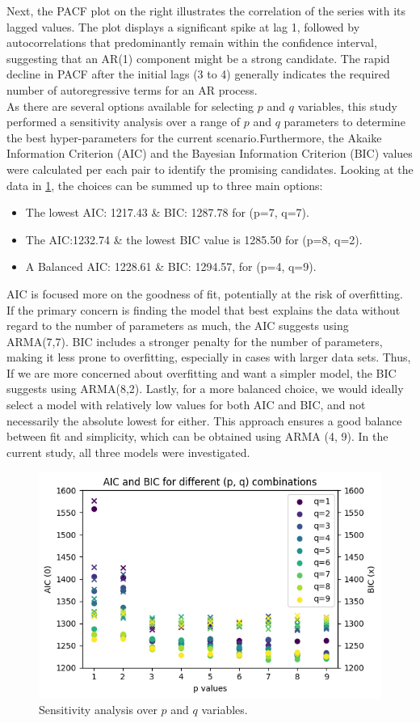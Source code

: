 \documentclass{article}
\begin{document}
Next, the PACF plot on the right illustrates the correlation of the series with its lagged values. The plot displays a significant spike at lag 1, followed by autocorrelations that predominantly remain within the confidence interval, suggesting that an AR(1) component might be a strong candidate. The rapid decline in PACF after the initial lags (3 to 4) generally indicates the required number of autoregressive terms for an AR process.\\ 
As there are several options available for selecting $p$ and $q$ variables, this study performed a sensitivity analysis over a range of $p$ and $q$ parameters to determine the best hyper-parameters for the current scenario.\@ Furthermore, the Akaike Information Criterion (AIC) and the Bayesian Information Criterion (BIC) values were calculated per each pair to identify the promising candidates. Looking at the data in \ref{fig:sensitivity}, the choices can be summed up to three main options:
\begin{itemize}
    \item The lowest AIC: 1217.43 \& BIC: 1287.78 for (p=7, q=7).
    \item The AIC:1232.74 \& the lowest BIC value is 1285.50 for (p=8, q=2).
    \item A Balanced AIC: 1228.61 \& BIC: 1294.57, for (p=4, q=9).
\end{itemize}
AIC is focused more on the goodness of fit, potentially at the risk of overfitting. If the primary concern is finding the model that best explains the data without regard to the number of parameters as much, the AIC suggests using ARMA(7,7).
BIC includes a stronger penalty for the number of parameters, making it less prone to overfitting, especially in cases with larger data sets. Thus, If we are more concerned about overfitting and want a simpler model, the BIC suggests using ARMA(8,2).
Lastly, for a more balanced choice, we would ideally select a model with relatively low values for both AIC and BIC, and not necessarily the absolute lowest for either. This approach ensures a good balance between fit and simplicity, which can be obtained using ARMA (4, 9). In the current study, all three models were investigated.
\begin{figure}[h]
    \centering
    \includegraphics[width=0.75\linewidth]{Fig03.png}
    \caption{\label{fig:sensitivity} Sensitivity analysis over $p$ and $q$ variables.}
\end{figure}
\end{document}

